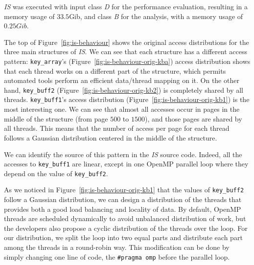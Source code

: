 \emph{IS} was executed with input class \emph{D} for the performance
evaluation, resulting in a memory usage of $33.5$Gib, and class \emph{B} for
the analysis, with a memory usage of $0.25Gib$.

The top of Figure~\ref{fig:is-behaviour} shows the original access distributions for the
three main structures of \emph{IS}. We can see that
each structure has a different access pattern: \texttt{key\_array}'s
(Figure~\ref{fig:is-behaviour-orig-kba}) access distribution shows that each
thread works on a different part of the structure, which permits automated
tools perform an efficient data/thread mapping on it. On the other hand, \texttt{key\_buff2}
(Figure~\ref{fig:is-behaviour-orig-kb2}) is completely shared by all threads.
\texttt{key\_buff1}'s access distribution (Figure~\ref{fig:is-behaviour-orig-kb1})
is the most interesting one. We can see that almost all accesses occur
in pages in the middle of the structure (from page $500$ to $1500$), and those pages
are shared by all threads. This means that the number of access per page  for
each thread follows a Gaussian distribution centered in the middle of the
structure.

%

We can identify the source of this pattern in the \emph{IS} source code. Indeed, all the accesses to \texttt{key\_buff1} are linear,
except in one OpenMP parallel loop where they depend on the value of
\texttt{key\_buff2}.

As we noticed in Figure~\ref{fig:is-behaviour-orig-kb1} that the values of \texttt{key\_buff2}
follow a Gaussian distribution, we can design a distribution of the threads that
provides both a good load balancing and locality of data.
By default, OpenMP threads are scheduled dynamically to avoid unbalanced
distribution of work, but the developers also propose a cyclic distribution
of the threads over the loop.
For our distribution, we split
the loop into two equal parts and distribute each part among the threads in a round-robin way.
This modification can be done by simply changing one line of code, the
\texttt{\#pragma omp} before the parallel loop.

